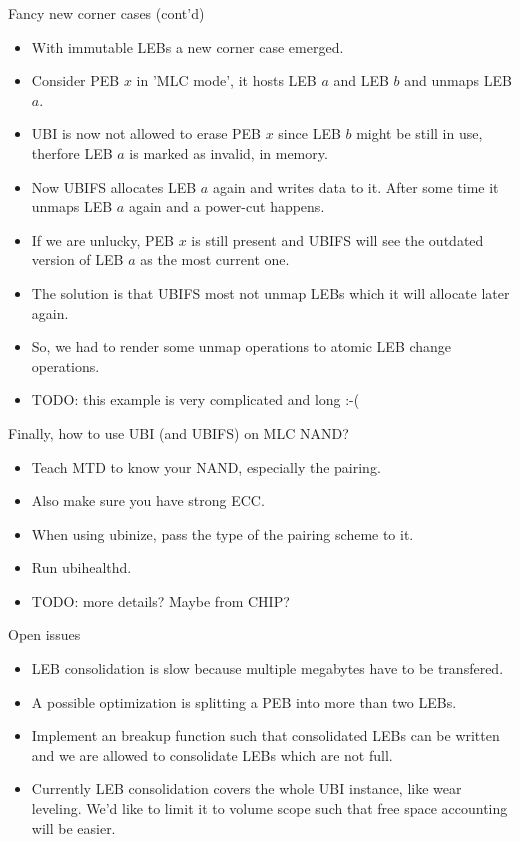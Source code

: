 \documentclass[aspectratio=169,obeyspaces,spaces,hyphens,dvipsnames]{beamer}
\begin{document}
\begin{frame}{Fancy new corner cases (cont'd)}
  \begin{itemize}
  \item With immutable LEBs a new corner case emerged.
  \item Consider PEB $x$ in 'MLC mode', it hosts LEB $a$ and LEB $b$ and unmaps LEB $a$.
  \item UBI is now not allowed to erase PEB $x$ since LEB $b$ might be still in use, therfore LEB $a$ is marked
        as invalid, in memory.
  \item Now UBIFS allocates LEB $a$ again and writes data to it. After some time it unmaps LEB $a$ again and
        a power-cut happens.
  \item If we are unlucky, PEB $x$ is still present and UBIFS will see the outdated version of LEB $a$ as the most current one.
  \item The solution is that UBIFS most not unmap LEBs which it will allocate later again.
  \item So, we had to render some unmap operations to atomic LEB change operations.
  \item TODO: this example is very complicated and long :-(
  \end{itemize}
\end{frame}

\begin{frame}{Finally, how to use UBI (and UBIFS) on MLC NAND?}
  \begin{itemize}
  \item Teach MTD to know your NAND, especially the pairing.
  \item Also make sure you have strong ECC.
  \item When using ubinize, pass the type of the pairing scheme to it.
  \item Run ubihealthd.
  \item TODO: more details? Maybe from CHIP?
  \end{itemize}
\end{frame}

\begin{frame}{Open issues}
  \begin{itemize}
  \item LEB consolidation is slow because multiple megabytes have to be transfered.
  \item A possible optimization is splitting a PEB into more than two LEBs.
  \item Implement an breakup function such that consolidated LEBs can be written and
        we are allowed to consolidate LEBs which are not full.
  \item Currently LEB consolidation covers the whole UBI instance, like wear leveling.
        We'd like to limit it to volume scope such that free space accounting will be easier.
  \end{itemize}
\end{frame}
\end{document}
